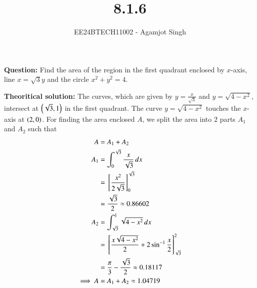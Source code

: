 \documentclass[journal]{IEEEtran}
\begin{document}

\vspace{3cm}

\title{8.1.6}
\author{EE24BTECH11002 - Agamjot Singh}
{\let\newpage\relax\maketitle}

\renewcommand{\thefigure}{\theenumi}
\renewcommand{\thetable}{\theenumi}
\setlength{\intextsep}{10pt} %

\textbf{Question:}
\newline
Find the area of the region in the first quadrant enclosed by $x$-axis, line $x = \sqrt{3}y$ and the circle $x^2 + y^2 = 4$.

\textbf{Theoritical solution:}
The curves, which are given by $y = \frac{x}{\sqrt{3}}$ and $y = \sqrt{4 - x^2}$, intersect at $\left(\sqrt{3}, 1\right)$ in the first quadrant. The curve $y = \sqrt{4 - x^2}$ touches the $x$-axis at $\left(2, 0\right)$.
\newline
For finding the area enclosed $A$, we split the area into $2$ parts $A_1$ and $A_2$ such that
\begin{align}
    A &= A_1 + A_2\\
    A_1 &= \int_{0}^{\sqrt{3}} \frac{x}{\sqrt{3}} \, dx\\
        &= {}\left[\frac{x^2}{2\sqrt{3}}\right]_{0}^{\sqrt{3}}\\
        &= \frac{\sqrt{3}}{2} \approx 0.86602\\
    A_2 &= \int_{\sqrt{3}}^{1} \sqrt{4 - x^2} \, dx\\
        &= {}\left[\frac{x\sqrt{4 - x^2}}{2} + 2\sin^{-1}{\frac{x}{2}}\right]_{\sqrt{3}}^{2}\\
        &= \frac{\pi}{3} - \frac{\sqrt{3}}{2} \approx 0.18117\\
    \implies A &= A_1 + A_2 \approx 1.04719
\end{align}
\end{document}
